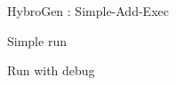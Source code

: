 \begin{Frame}{HybroGen : Simple-Add-Exec}
    \begin{block}{Simple run}
      
    \end{block}
    \begin{block}{Run with debug}
      
    \end{block}
\end{Frame}
